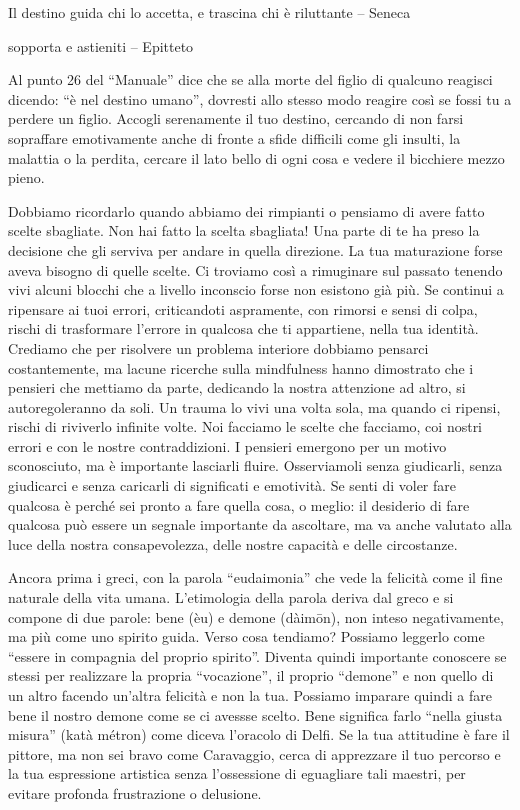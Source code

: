 \documentclass[12pt]{book} %
\begin{document}
Il destino guida chi lo accetta, e trascina chi è riluttante – Seneca

sopporta e astieniti – Epitteto

Al punto 26 del “Manuale” dice che se alla morte del figlio di qualcuno reagisci
dicendo: “è nel destino umano”, dovresti allo stesso modo reagire così se fossi tu a perdere un figlio. Accogli
serenamente il tuo destino, cercando di non farsi sopraffare emotivamente anche di fronte a sfide difficili come gli insulti, la malattia o la perdita, cercare il lato bello di ogni cosa e vedere il bicchiere mezzo pieno.

Dobbiamo ricordarlo quando abbiamo dei rimpianti o pensiamo di avere fatto scelte sbagliate. Non hai fatto la scelta
sbagliata! Una parte di te ha preso la decisione che gli serviva per andare in quella direzione. La tua maturazione forse
aveva bisogno di quelle scelte. Ci troviamo così a rimuginare sul passato tenendo vivi alcuni blocchi che a livello
inconscio forse non esistono già più. Se continui a ripensare ai tuoi errori, criticandoti aspramente, con rimorsi e sensi di
colpa, rischi di trasformare l'errore in qualcosa che ti appartiene, nella tua identità.
Crediamo che per risolvere un problema interiore dobbiamo pensarci costantemente, ma lacune ricerche sulla mindfulness hanno dimostrato che i pensieri che mettiamo da parte, dedicando la nostra attenzione ad altro, si autoregoleranno da soli.
Un trauma lo vivi una volta sola, ma quando ci ripensi, rischi di riviverlo infinite volte. Noi facciamo le scelte che facciamo, coi
nostri errori e con le nostre contraddizioni. I pensieri emergono per un motivo sconosciuto, ma è importante lasciarli
fluire. Osserviamoli senza giudicarli, senza giudicarci e senza caricarli di significati e emotività. 
Se senti di voler fare qualcosa è perché sei pronto a fare quella cosa, o meglio: il desiderio di fare qualcosa può essere un segnale importante da ascoltare, ma va anche valutato alla luce della nostra consapevolezza, delle nostre capacità e delle circostanze.

Ancora prima i greci, con la parola “eudaimonia” che vede la felicità come il fine naturale della vita umana.
L'etimologia della parola deriva dal greco e si compone di due parole: bene (èu) e demone
(dàimōn), non inteso negativamente, ma più come uno spirito guida. Verso cosa tendiamo? Possiamo leggerlo come “essere
in compagnia del proprio spirito”. Diventa quindi importante conoscere se stessi per realizzare la propria “vocazione”,
il proprio “demone” e non quello di un altro facendo un'altra felicità e non la tua. Possiamo imparare quindi a fare bene il nostro demone come se ci avessse scelto. Bene significa farlo “nella giusta misura” (katà métron) come
diceva l'oracolo di Delfi. Se la tua attitudine è fare il pittore, ma non sei bravo come
Caravaggio, cerca di apprezzare il tuo percorso e la tua espressione artistica senza l'ossessione di eguagliare tali maestri, per evitare profonda frustrazione o delusione.
\end{document}
